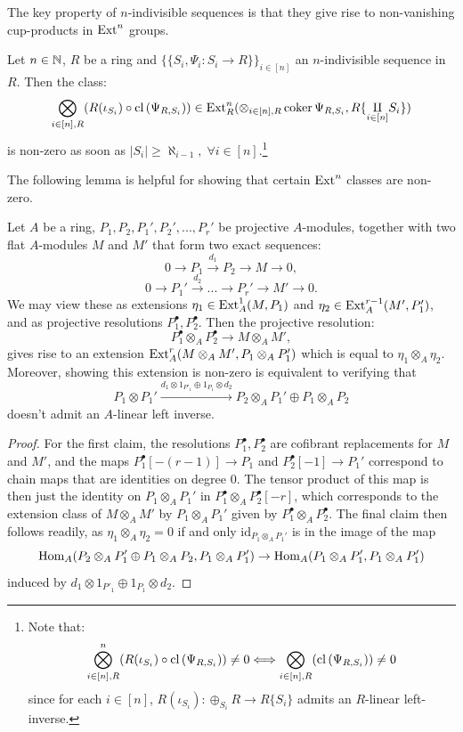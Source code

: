 The key property of $n$-indivisible sequences is that they give rise to non-vanishing cup-products in $\operatorname{Ext}^n$ groups.
\begin{theorem}\label{theorem:indivisiblecup}
Let $n \in \mathbb{N}$, $R$ be a ring and $\{\{S_i, \Psi_i: S_i \to R\}\}_{i \in [n]}$ an $n$-indivisible sequence in $R$. Then the class:
\[\bigotimes_{i \in [n],R} (R(\iota_{S_i}) \circ \mathrm{cl}\left(\Psi_{R,S_i}\right)) \in \operatorname{Ext}^{n}_{R}(\otimes_{i \in [n],R} \operatorname{coker}{\Psi_{R,S_i}}, R\{\underset{i \in [n]}{\amalg} S_i\})\]
is non-zero as soon as $|S_i| \ge \aleph_{i-1}, \; \forall i \in [n]$.\footnote{Note that:
\[\bigotimes_{i\in [n],R}^n (R(\iota_{S_i}) \circ \mathrm{cl}\left(\Psi_{R,S_i}\right)) \neq 0 \Longleftrightarrow \bigotimes_{i\in [n],R} (\mathrm{cl}\left(\Psi_{R,S_i}\right)) \neq 0\]
since for each $i \in [n]$, $R({\iota}_{S_i}): \oplus_{S_i} R \to R\{S_i\}$ admits an $R$-linear left-inverse.}
\end{theorem}
The following lemma is helpful for showing that certain $\operatorname{Ext}^n$ classes are non-zero.
\begin{lemma}\label{lemma:extcrit}
Let $A$ be a ring, $P_1, P_2, P_1', P_2', ..., P_r'$ be projective $A$-modules, together with two flat $A$-modules $M$ and $M'$ that form two exact sequences:
\[0 \to P_1 \stackrel{d_1}{\to} P_2 \to M \to 0,\]
\[0 \to P_1' \stackrel{d_2}{\to} ... \to P_r' \to M' \to 0.\]
We may view these as extensions $\eta_1 \in \operatorname{Ext}^1_A(M, P_1)$ and $\eta_2 \in \operatorname{Ext}^{r-1}_A(M',P_1')$, 
and as projective resolutions $P^{\bullet}_1, P^{\bullet}_2$. Then the projective resolution:
\[P^{\bullet}_1 \otimes_A P^{\bullet}_2 \to M \otimes_A M',\]
gives rise to an extension $\operatorname{Ext}^{r}_A(M \otimes_A M', P_1 \otimes_A P_1')$ which is equal to $\eta_1 \otimes_A \eta_2$. 
Moreover, showing this extension is non-zero is equivalent to verifying that 
\[P_1 \otimes P_1' \stackrel{d_1 \otimes 1_{P'_1} \oplus 1_{P_1} \otimes d_2}{\to} P_2 \otimes_A P_1' \oplus P_1 \otimes_A P_2\]
doesn't admit an $A$-linear left inverse.
\end{lemma}
\begin{proof}
For the first claim, the resolutions $P_1^{\bullet}, P_2^{\bullet}$ are cofibrant replacements for $M$ and $M'$, and the 
maps $P_1^{\bullet}[-(r-1)] \to P_1$ and $P_2^{\bullet}[-1] \to P_1'$ correspond to chain maps that are identities on degree 0. 
The tensor product of this map is then just the identity on $P_1 \otimes_A P_1'$ in $P_1^{\bullet} \otimes_A P_2^{\bullet}[-r]$, 
which corresponds to the extension class of $M\otimes_A M'$ by $P_1 \otimes_A P_1'$ given by $P_1^{\bullet} \otimes_A P_2^{\bullet}$. 
The final claim then follows readily, as $\eta_1 \otimes_A \eta_2 = 0$ if and only $\mathrm{id}_{P_1 \otimes_A P_1'}$ is in the image 
of the map 
\[\operatorname{Hom}_A(P_2 \otimes_A P_1' \oplus P_1 \otimes_A P_2, P_1 \otimes_A P_1') \rightarrow \operatorname{Hom}_A(P_1 \otimes_A P_1', P_1 \otimes_A P_1')\]
induced by $d_1 \otimes 1_{P'_1} \oplus 1_{P_1} \otimes d_2$.
\end{proof}
